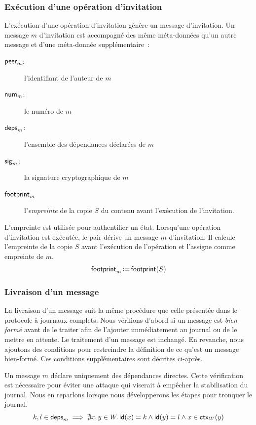 \subsubsection{Exécution d'une opération d'invitation}

L'exécution d'une opération d'invitation génère un message d'invitation.
Un message $m$ d'invitation est accompagné des même méta-données qu'un autre message et d'une méta-donnée supplémentaire~:
\begin{description}
    \item[$\operatorname{\mathsf{peer}}_m$:] l'identifiant de l'auteur de $m$ 
    \item[$\operatorname{\mathsf{num}}_m$:] le numéro de $m$
    \item[$\operatorname{\mathsf{deps}}_m$:] l'ensemble des dépendances déclarées de $m$
    \item[$\operatorname{\mathsf{sig}}_m$:] la signature cryptographique de $m$
    \item[$\operatorname{\mathsf{footprint}}_m$] l'\emph{empreinte} de la copie $S$ du contenu avant l'exécution de l'invitation.
\end{description}

L'empreinte est utilisée pour authentifier un état.
Lorsqu'une opération d'invitation est exécutée, le pair dérive un message $m$ d'invitation.
Il calcule l'empreinte de la copie $S$ avant l'exécution de l'opération et l'assigne comme empreinte de $m$.
%
\begin{equation*}
    \operatorname{\mathsf{footprint}}_m \operatorname{\vcentcolon=} \operatorname{\mathsf{footprint}}(S)
\end{equation*}


\subsubsection{Livraison d'un message}

La livraison d'un message suit la même procédure que celle présentée dans le protocole à journaux complets.
Nous vérifions d'abord si un message est \emph{bien-formé} avant de le traiter afin de l'ajouter immédiatement au journal ou de le mettre en attente.
Le traitement d'un message est inchangé.
En revanche, nous ajoutons des conditions pour restreindre la définition de ce qu'est un message bien-formé.
Ces conditions supplémentaires sont décrites ci-après.

Un message $m$ déclare uniquement des dépendances directes.
Cette vérification est nécessaire pour éviter une attaque qui viserait à empêcher la stabilisation du journal.
Nous en reparlons lorsque nous développerons les étapes pour tronquer le journal.
%
\begin{equation}\label{eq:direct-dep-verif}
    k, l \in \operatorname{\mathsf{deps}}_m \implies \nexists x, y \in W \ldotp \operatorname{\mathsf{id}}(x) = k \land \operatorname{\mathsf{id}}(y) = l \land x \in \operatorname{\mathsf{ctx}}_W(y)
\end{equation}

